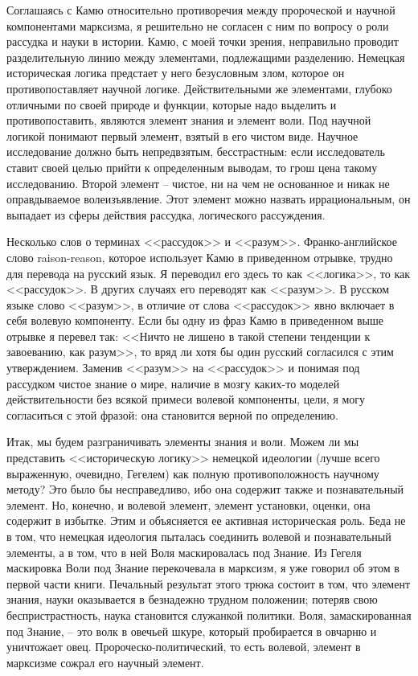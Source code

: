 \documentclass{book}
\begin{document}
Соглашаясь с Камю относительно противоречия между пророческой и научной компонентами марксизма, я решительно не согласен с ним по вопросу о роли рассудка и науки в истории. Камю, с моей точки зрения, неправильно проводит разделительную линию между элементами, подлежащими разделению. Немецкая историческая логика предстает у него безусловным злом, которое он противопоставляет научной логике. Действительными же элементами, глубоко отличными по своей природе и функции, которые надо выделить и противопоставить, являются элемент знания и элемент воли. Под научной логикой понимают первый элемент, взятый в его чистом виде. Научное исследование должно быть непредвзятым, бесстрастным: если исследователь ставит своей целью прийти к определенным выводам, то грош цена такому исследованию. Второй элемент -- чистое, ни на чем не основанное и никак не оправдываемое волеизъявление. Этот элемент можно назвать иррациональным, он выпадает из сферы действия рассудка, логического рассуждения.

Несколько слов о терминах <<рассудок>> и <<разум>>. Франко-английское слово raison-reason, которое использует Камю в приведенном отрывке, трудно для перевода на русский язык. Я переводил его здесь то как <<логика>>, то как <<рассудок>>. В других случаях его переводят как <<разум>>. В русском языке слово <<разум>>, в отличие от слова <<рассудок>> явно включает в себя волевую компоненту. Если бы одну из фраз Камю в при­веденном выше отрывке я перевел так: <<Ничто не лишено в такой степени тенденции к завоеванию, как разум>>, то вряд ли хотя бы один русский согласился с этим утверждением. Заменив <<разум>> на <<рассудок>> и понимая под рассудком чистое знание о мире, наличие в мозгу каких-то моделей действительности без всякой примеси волевой компоненты, цели, я могу согласиться с этой фразой: она становится верной по определению.

Итак, мы будем разграничивать элементы знания и воли. Можем ли мы представить <<историческую логику>> немецкой идеологии (лучше всего выраженную, очевидно, Гегелем) как пол­ную противоположность научному методу? Это было бы несправедливо, ибо она содержит также и познавательный элемент. Но, конечно, и волевой элемент, элемент установки, оценки, она содержит в избытке. Этим и объясняется ее активная исто­рическая роль. Беда не в том, что немецкая идеология пыталась соединить волевой и познавательный элементы, а в том, что в ней Воля маскировалась под Знание. Из Гегеля маскировка Воли под Знание перекочевала в марксизм, я уже говорил об этом в первой части книги. Печальный результат этого трюка состоит в том, что элемент знания, науки оказывается в безнадежно трудном положении; потеряв свою беспристрастность, наука становится служанкой политики. Воля, замаскированная под Знание, -- это волк в овечьей шкуре, который пробирается в овчарню и уничтожает овец. Пророческо-политический, то есть волевой, элемент в 
марксизме сожрал его научный элемент.
\end{document}
